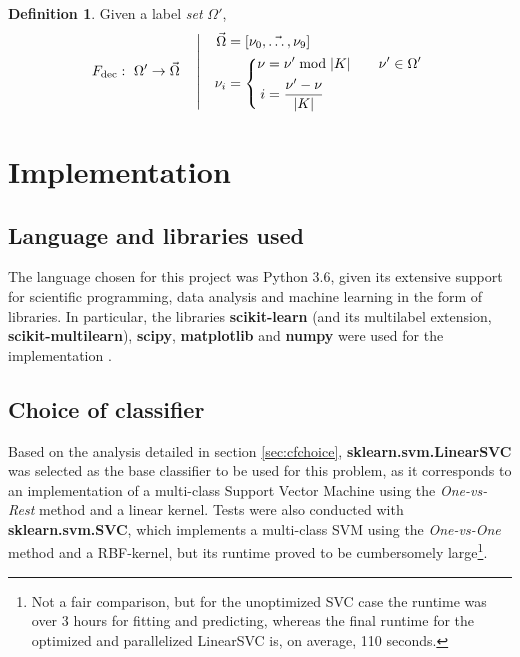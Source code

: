 \documentclass{kthreport}
\theoremstyle{definition}
\newtheorem{definition}{Definition}
\begin{document}
\begin{definition} Given a label \emph{set} $\Omega'$,
    \begin{equation}
    F_{\text{dec}}:\ \Omega' \rightarrow \vec{\Omega} \quad \left\vert \quad
    \begin{aligned}
    \vec{\Omega} &= [\vec{\nu_{0}, \ldots, \nu_{9}}] \\
    \nu_{i} &= \left \{
    \begin{aligned}
    \nu &= \nu' \bmod |K| \qquad \nu' \in \Omega'\\
    i &= \frac{\nu' - \nu}{|K|}
    \end{aligned}\right.\\
    \end{aligned}\right.\\
    \end{equation}
\end{definition}


\section{Implementation}

\subsection{Language and libraries used}

The language chosen for this project was Python 3.6, given its extensive support for scientific programming, data analysis and machine learning in the form of libraries. In particular, the libraries \textbf{scikit-learn} (and its multilabel extension, \textbf{scikit-multilearn}), \textbf{scipy}, \textbf{matplotlib} and \textbf{numpy} were used for the implementation \autocite{scikit-learn,scikit-multilearn,scipy,matplotlib,numpy}.

\subsection{Choice of classifier}

Based on the analysis detailed in section \ref{sec:cfchoice}, \textbf{sklearn.svm.LinearSVC} was selected as the base classifier to be used for this problem, as it corresponds to an implementation of a multi-class Support Vector Machine using the \emph{One-vs-Rest} method and a linear kernel. Tests were also conducted with \textbf{sklearn.svm.SVC}, which implements a multi-class SVM using the \emph{One-vs-One} method and a RBF-kernel, but its runtime proved to be cumbersomely large\footnote{Not a fair comparison, but for the unoptimized SVC case the runtime was over \num{3} hours for fitting and predicting, whereas the final runtime for the optimized and parallelized LinearSVC is, on average, \num{110} seconds.}.
\end{document}
